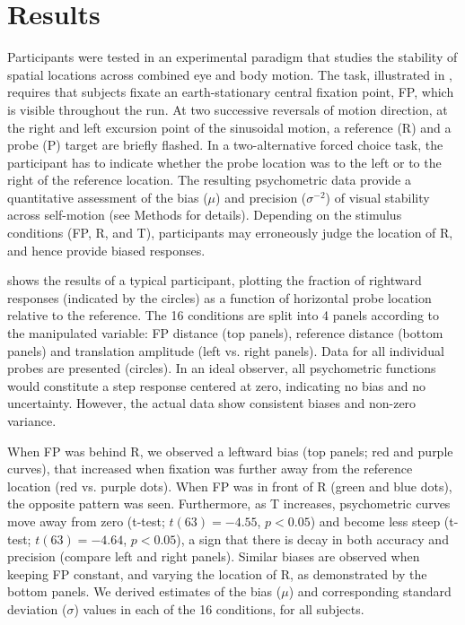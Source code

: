 \section{Results}

Participants were tested in an experimental paradigm that studies the stability of spatial locations across combined eye and body motion. The task, illustrated in , requires that subjects fixate an earth-stationary central fixation point, FP, which is visible throughout the run. At two successive reversals of motion direction, at the right and left excursion point of the sinusoidal motion, a reference (R) and a probe (P) target are briefly flashed. In a two-alternative forced choice task, the participant has to indicate whether the probe location was to the left or to the right of the reference location. The resulting psychometric data provide a quantitative assessment of the bias ($\mu$) and precision ($\sigma^{-2}$) of visual stability across self-motion (see Methods for details). Depending on the stimulus conditions (FP, R, and T), participants may erroneously judge the location of R, and hence provide biased responses.

 shows the results of a typical participant, plotting the fraction of rightward responses (indicated by the circles) as a function of horizontal probe location relative to the reference. The 16 conditions are split into 4 panels according to the manipulated variable: FP distance (top panels), reference distance (bottom panels) and translation amplitude (left vs. right panels). Data for all individual probes are presented (circles). In an ideal observer, all psychometric functions would constitute a step response centered at zero, indicating no bias and no uncertainty. However, the actual data show consistent biases and non-zero variance.

When FP was behind R, we observed a leftward bias (top panels; red and purple curves), that increased when fixation was further away from the reference location (red vs. purple dots). When FP was in front of R (green and blue dots), the opposite pattern was seen. Furthermore, as T increases, psychometric curves move away from zero (t-test; $t(63) = -4.55$, $p < 0.05$) and become less steep (t-test; $t(63) = -4.64$, $p < 0.05$), a sign that there is decay in both accuracy and precision (compare left and right panels). Similar biases are observed when keeping FP constant, and varying the location of R, as demonstrated by the bottom panels. We derived estimates of the bias ($\mu$) and corresponding standard deviation ($\sigma$) values in each of the 16 conditions, for all subjects.

